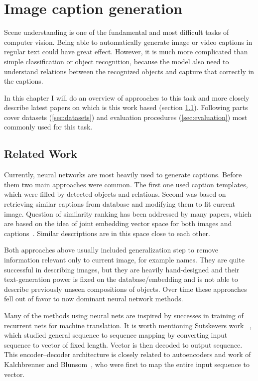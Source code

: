 \chapter{Image caption generation}\label{chp:captions}

Scene understanding is one of the fundamental and most difficult tasks of computer vision. Being able to automatically generate image or video captions in regular text could have great effect. However, it is much more complicated than simple classification or object recognition, because the model also need to understand relations between the recognized objects and capture that correctly in the captions.

In this chapter I will do an overview of approaches to this task and more closely describe latest papers on which is this work based (section \ref{sec:related}). Following parts cover datasets (\ref{sec:datasets}) and evaluation procedures (\ref{sec:evaluation}) most commonly used for this task.

	\section{Related Work}
	\label{sec:related}

Currently, neural networks are most heavily used to generate captions. Before them two main approaches were common. The first one used caption templates, which were filled by detected objects and relations. Second was based on retrieving similar captions from database and modifying them to fit current image. Question of similarity ranking has been addressed by many papers, which are based on the idea of joint embedding vector space for both images and captions~\cite{DBLP:journals/corr/KarpathyF14}. Similar descriptions are in this space close to each other.

Both approaches above usually included generalization step to remove information relevant only to current image, for example names. They are quite successful in describing images, but they are heavily hand-designed and their text-generation power is fixed on the database/embedding and is not able to describe previously unseen compositions of objects. Over time these approaches fell out of favor to now dominant neural network methods.

Many of the methods using neural nets are inspired by successes in training of recurrent nets for machine translation. It is worth mentioning Sutskevers work ~\cite{DBLP:journals/corr/SutskeverVL14}, which studied general sequence to sequence mapping by converting input sequence to vector of fixed length. Vector is then decoded to output sequence. This encoder--decoder architecture is closely related to autoencoders and work of Kalchbrenner and Blunsom~\cite{conf/emnlp/KalchbrennerB13}, who were first to map the entire input sequence to vector.

